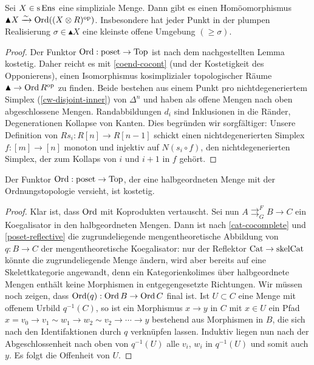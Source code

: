 \begin{prop} \label{clumsy-order-top}
  Sei $X \in \operatorname{s}\operatorname{Ens}$ eine simpliziale Menge. Dann gibt es einen
  Homöomorphismus $\blacktriangle X \xrightarrow[]{\sim} \operatorname{Ord}((X \otimes
  R)^\mathrm{op})$. Insbesondere hat jeder Punkt in der plumpen Realisierung
  $\sigma \in \blacktriangle X$ eine kleinste offene Umgebung $(\geq
  \sigma)$.
\end{prop}
\begin{proof}
  Der Funktor $\operatorname{Ord}: \operatorname{poset} \to \operatorname{Top}$ ist nach dem nachgestellten
  Lemma kostetig. Daher reicht es mit \ref{coend-cocont} (und der
  Kostetigkeit des Opponierens), einen Isomorphismus kosimplizialer
  topologischer Räume $\blacktriangle \to \operatorname{Ord} R^\mathrm{op}$ zu finden. Beide
  bestehen aus einem Punkt pro nichtdegeneriertem Simplex
  (\ref{cw-disjoint-inner}) von $\Delta^n$ und haben als offene Mengen
  nach oben abgeschlossene Mengen. Randabbildungen $d_i$ sind
  Inklusionen in die Ränder, Degenerationen Kollapse von Kanten. Dies
  begründen wir sorgfältiger: Unsere Definition von $Rs_i: R[n] \to
  R[n-1]$ schickt einen nichtdegenerierten Simplex $f: [m] \to [n]$
  monoton und injektiv auf $N(s_i \circ f)$, den nichtdegenerierten
  Simplex, der zum Kollaps von $i$ und $i+1$ in $f$ gehört.
\end{proof}
\begin{lemma}
  Der Funktor $\operatorname{Ord}: \operatorname{poset} \to \operatorname{Top}$, der eine halbgeordneten Menge
  mit der Ordnungstopologie versieht, ist kostetig.
\end{lemma}
\begin{proof}
    Klar ist, dass $\operatorname{Ord}$ mit Koprodukten vertauscht. Sei nun $A
    \mathrel{\mathop{\rightrightarrows}^{F}_{G}} B \to C$ ein
    Koegalisator in den halbgeordneten Mengen. Dann ist nach
    \ref{cat-cocomplete} und \ref{poset-reflective} die
    zugrundeliegende mengentheoretische Abbildung von $q: B \to C$ der
    mengentheoretische Koegalisator: nur der Reflektor $\operatorname{Cat} \to
    \mathrm{skelCat}$ könnte die zugrundeliegende Menge ändern, wird
    aber bereits auf eine Skelettkategorie angewandt, denn ein
    Kategorienkolimes über halbgeordnete Mengen enthält keine
    Morphismen in entgegengesetzte Richtungen. Wir müssen noch zeigen,
    dass $\operatorname{Ord}(q): \operatorname{Ord} B \to \operatorname{Ord} C$ final ist. Ist $U \subset C$
    eine Menge mit offenem Urbild $q^{-1}(C)$, so ist ein Morphismus
    $x \to y$ in $C$ mit $x \in U$ ein Pfad $x = v_0 \to v_1 \sim w_1
    \to w_2 \sim v_2 \to \cdots \to y$ bestehend aus Morphismen in
    $B$, die sich nach den Identifaktionen durch $q$ verknüpfen
    lassen. Induktiv liegen nun nach der Abgeschlossenheit nach oben
    von $q^{-1}(U)$ alle $v_i$, $w_i$ in $q^{-1}(U)$ und somit auch
    $y$. Es folgt die Offenheit von $U$.
\end{proof}

